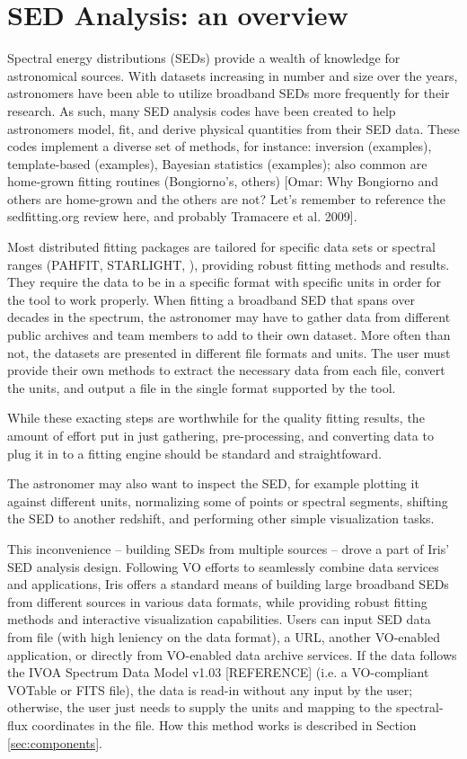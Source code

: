 \section{SED Analysis: an overview}
\label{sec:overview}

Spectral energy distributions (SEDs) provide a wealth of knowledge for astronomical sources. With datasets increasing in number and size over the years, astronomers have been able to utilize broadband SEDs more frequently for their research. As such, many SED analysis codes have been created to help astronomers model, fit, and derive physical quantities from their SED data. These codes implement a diverse set of methods, for instance: inversion (examples), template-based (examples), Bayesian statistics (examples); also common are home-grown fitting routines (Bongiorno's, others) [Omar: Why Bongiorno and others are home-grown and the others are not? Let's remember to reference the sedfitting.org review here, and probably Tramacere et al. 2009]. 

Most distributed fitting packages are tailored for specific data sets or spectral ranges (PAHFIT, STARLIGHT, ), providing robust fitting methods and results. They require the data to be in a specific format with specific units in order for the tool to work properly. When fitting a broadband SED that spans over decades in the spectrum, the astronomer may have to gather data from different public archives and team members to add to their own dataset. More often than not, the datasets are presented in different file formats and units. The user must provide their own methods to extract the necessary data from each file, convert the units, and output a file in the single format supported by the tool.

While these exacting steps are worthwhile for the quality fitting results, the amount of effort put in just gathering, pre-processing, and converting data to plug it in to a fitting engine should be standard and straightfoward.

The astronomer may also want to inspect the SED, for example plotting it against different units, normalizing some of points or spectral segments, shifting the SED to another redshift, and performing other simple visualization tasks.

This inconvenience -- building SEDs from multiple sources -- drove a part of Iris' SED analysis design. Following VO efforts to seamlessly combine data services and applications, Iris offers a standard means of building large broadband SEDs from different sources in various data formats, while providing robust fitting methods and interactive visualization capabilities. Users can input SED data from file (with high leniency on the data format), a URL, another VO-enabled application, or directly from VO-enabled data archive services. If the data follows the IVOA Spectrum Data Model v1.03 [REFERENCE] (i.e. a VO-compliant VOTable or FITS file), the data is read-in without any input by the user; otherwise, the user just needs to supply the units and  mapping to the spectral-flux coordinates in the file. How this method works is described in Section \ref{sec:components}. 

